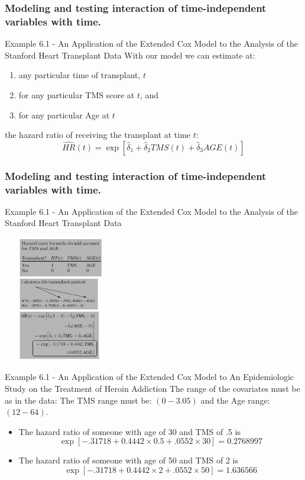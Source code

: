 \documentclass{beamer}
\theoremstyle{definition}
\begin{document}
\begin{frame}
\frametitle{Modeling and testing interaction of time-independent variables with time.}
\begin{block}{Example 6.1 - An Application of the Extended Cox Model to the Analysis of the Stanford Heart Transplant Data}
With our model we can estimate at:
\begin{enumerate}
\item any particular time of transplant, $t$
\item  for any particular TMS score at $t$, and
\item for any particular Age at $t$
\end{enumerate}
the hazard ratio of receiving the transplant at time $t$:
\[
\hat{HR}(t) = \exp[\hat{\delta}_1 + \hat{\delta}_2 TMS(t) + \hat{\delta}_3 AGE(t)]
\]
\end{block}
\end{frame}

\begin{frame}
\frametitle{Modeling and testing interaction of time-independent variables with time.}
\begin{block}{Example 6.1 - An Application of the Extended Cox Model to the Analysis of the Stanford Heart Transplant Data}
    \begin{center}
        \includegraphics[width =5cm, height=5.5cm]{CH6_trnsp5.JPG}
    \end{center}
\end{block}
\end{frame}

\begin{frame}
\begin{block}{Example 6.1 - An Application of the Extended Cox Model to An Epidemiologic Study on the Treatment of Heroin Addiction}
The range of the covariates must be as in the data: The TMS range must be: $(0-3.05)$ and the Age range: $(12-64)$.
\begin{itemize}
\item The hazard ratio of someone with age of 30 and TMS of .5 is
\[ \exp[-.31718 + 0.4442\times 0.5 + .0552 \times 30] = 0.2768997
\]
\item The hazard ratio of someone with age of 50 and TMS of 2 is
\[ \exp[-.31718 + 0.4442\times 2 + .0552 \times 50] = 1.636566
\]
\end{itemize}
\end{block}
\end{frame}
\end{document}

